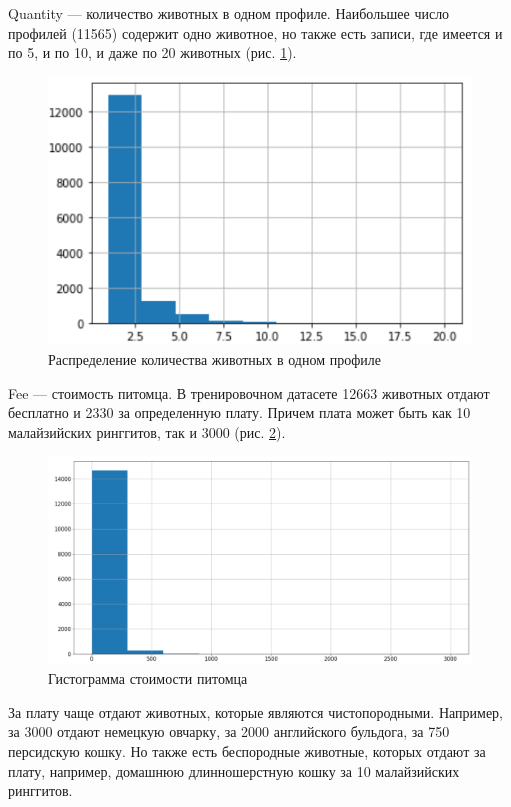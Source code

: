 \documentclass[14pt]{mmcs_article}
\begin{document}
Quantity --- количество животных в одном профиле. Наибольшее число профилей (11565) содержит одно животное, но также есть записи, где имеется и по 5, и по 10, и даже по 20 животных (рис. \ref{analyse:count}). 

\begin{figure}[H]
	\centering
	\includegraphics[scale=1]{count.png}
	\caption{Распределение количества животных в одном профиле}\label{analyse:count}
\end{figure}

Fee --- стоимость питомца. В тренировочном датасете 12663 животных отдают бесплатно и 2330 за определенную плату. Причем плата может быть как 10 малайзийских ринггитов, так и 3000 (рис. \ref{analyse:fee}). 

\begin{figure}[H]
	\centering
	\includegraphics[scale=0.5]{fee.png}
	\caption{Гистограмма стоимости питомца}\label{analyse:fee}
\end{figure}

За плату чаще отдают животных, которые являются чистопородными. Например, за 3000 отдают немецкую овчарку, за 2000 английского бульдога, за 750 персидскую кошку. Но также есть беспородные животные, которых отдают за плату, например, домашнюю длинношерстную кошку за 10 малайзийских ринггитов.
\end{document}
